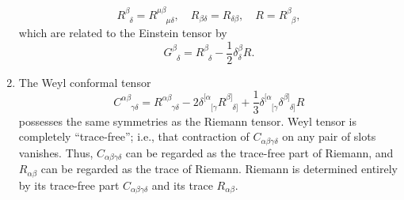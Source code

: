 \begin{enumerate}
\[R^{\beta}_{\phantom{\beta}\delta} = R^{\mu \beta}_{\phantom{\mu \beta} \mu \delta} , \quad R_{\beta \delta}=R_{\delta \beta}, \quad R = R^{\beta}_{\phantom{\beta}\beta},\]
which are related to the Einstein tensor by 
\[G^{\beta}_{\phantom{\beta}\delta} =  R^{\beta}_{\phantom{\beta}\delta} - \frac{1}{2} \delta^{\beta}_{\delta}R.\]
\item The Weyl conformal tensor
\[C^{\alpha \beta}_{\phantom{\alpha \beta} \gamma \delta} = R^{\alpha \beta}_{\phantom{\alpha \beta} \gamma \delta} -2 \delta^{[\alpha}_{\phantom{[\alpha}[\gamma} R^{\beta]}_{\phantom{\beta]}\delta]} + \frac{1}{3} \delta^{[\alpha}_{\phantom{[\alpha}[\gamma} \delta^{\beta]}_{\phantom{\beta]}\delta]} R \]
possesses the same symmetries as the Riemann tensor. 
Weyl tensor is completely ``trace-free''; i.e., that
contraction of $C_{\alpha \beta \gamma \delta}$ on any pair of slots vanishes. Thus, $C_{\alpha \beta \gamma \delta}$ can be regarded as the trace-free part of Riemann, and $R_{\alpha \beta}$ can be regarded as the trace of Riemann. Riemann is determined entirely by its trace-free part $C_{\alpha \beta \gamma \delta}$ and
its trace $R_{\alpha \beta}$.
\end{enumerate}

